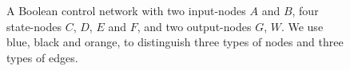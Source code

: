 

 


\begin{example}
	 \begin{figure}[thpb]
		\centering
		
		\caption{A Boolean control network with two input-nodes $A$ and $B$, four state-nodes $C$, $D$, $E$ and $F$, and two output-nodes $G$, $W$. We use blue, black and orange, to distinguish three types of nodes and three types of edges.}
		\label{fig:1}
	\end{figure}
	

\end{example}
